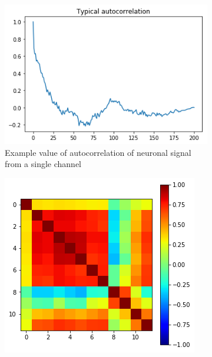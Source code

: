 \documentclass[a4paper,10pt]{article}
\begin{document}
\begin{figure}
    \centering
    \begin{subfigure}[b]{0.4\textwidth}
        \includegraphics[width=\textwidth]{img/example_neuro_autocorr.png}
        \caption{Example value of autocorrelation of neuronal signal from a single channel}
        \label{fig:example_neuro_autocorr}
    \end{subfigure}\hspace{0.05\textwidth}
    \begin{subfigure}[b]{0.4\textwidth}
        \includegraphics[width=\textwidth]{img/example_neuro_crosscorr_values.png}

\end{subfigure}
\end{figure}
\end{document}
